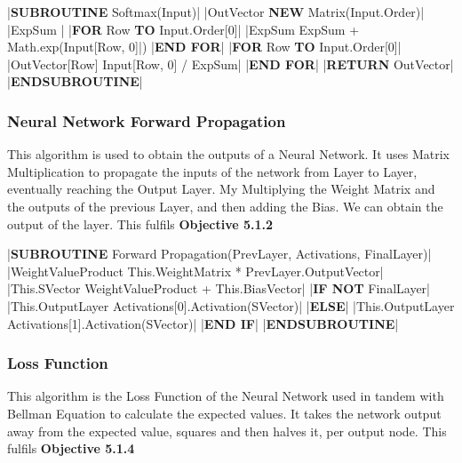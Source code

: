 \begin{flushleft}
                \vspace{0.2cm}
                \begin{pseudocode}
|\textbf{SUBROUTINE} Softmax(Input)|
    |OutVector \leftarrow \textbf{NEW} Matrix(Input.Order)|
    |ExpSum |
    |\textbf{FOR} Row  \textbf{TO} Input.Order[0]|
        |ExpSum \leftarrow ExpSum + Math.exp(Input[Row, 0]|)
    |\textbf{END FOR}|
    |\textbf{FOR} Row  \textbf{TO} Input.Order[0]|
        |OutVector[Row] \leftarrow Input[Row, 0] / ExpSum|
    |\textbf{END FOR}|
    |\textbf{RETURN} OutVector|
|\textbf{ENDSUBROUTINE}|
                \end{pseudocode}

                \vspace{0.5cm}
            \subsubsection{Neural Network Forward Propagation}
                This algorithm is used to obtain the outputs of a Neural Network. It uses Matrix Multiplication to propagate the inputs
                of the network from Layer to Layer, eventually reaching the Output Layer. My Multiplying the Weight Matrix and the outputs
                of the previous Layer, and then adding the Bias. We can obtain the output of the layer. This fulfils \textbf{Objective 5.1.2}

                \vspace{0.2cm}
                \begin{pseudocode}
|\textbf{SUBROUTINE} Forward Propagation(PrevLayer, Activations, FinalLayer)|
    |WeightValueProduct \leftarrow This.WeightMatrix * PrevLayer.OutputVector|
    |This.SVector \leftarrow WeightValueProduct + This.BiasVector|
    |\textbf{IF NOT} FinalLayer|
        |This.OutputLayer \leftarrow Activations[0].Activation(SVector)|
    |\textbf{ELSE}|
        |This.OutputLayer \leftarrow Activations[1].Activation(SVector)|
    |\textbf{END IF}| 
|\textbf{ENDSUBROUTINE}|
                \end{pseudocode}

                \vspace{0.5cm}
            \subsubsection{Loss Function}  
                This algorithm is the Loss Function of the Neural Network used in tandem with Bellman Equation to calculate the expected values. 
                It takes the network output away from the expected value, squares and then halves it, per output node. This fulfils \textbf{Objective 5.1.4}


\end{flushleft}
